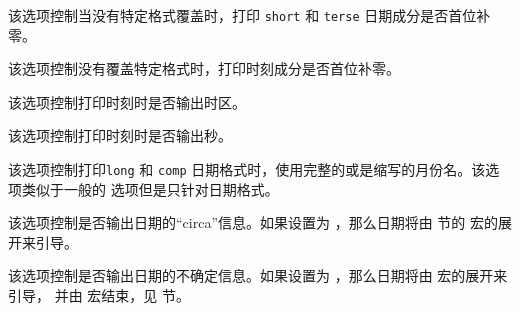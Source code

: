 \begin{optionlist}

该选项控制当没有特定格式覆盖时，打印 \texttt{short} 和 \texttt{terse} 日期成分是否首位补零。


该选项控制没有覆盖特定格式时，打印时刻成分是否首位补零。


该选项控制打印时刻时是否输出时区。


该选项控制打印时刻时是否输出秒。


该选项控制打印\texttt{long} 和 \texttt{comp} 日期格式时，使用完整的或是缩写的月份名。该选项类似于一般的  选项但是只针对日期格式。


该选项控制是否输出日期的“circa”信息。如果设置为 ，那么日期将由 节的 宏的展开来引导。


该选项控制是否输出日期的不确定信息。如果设置为 ，那么日期将由  宏的展开来引导，
并由  宏结束，见  节。



\end{optionlist}
